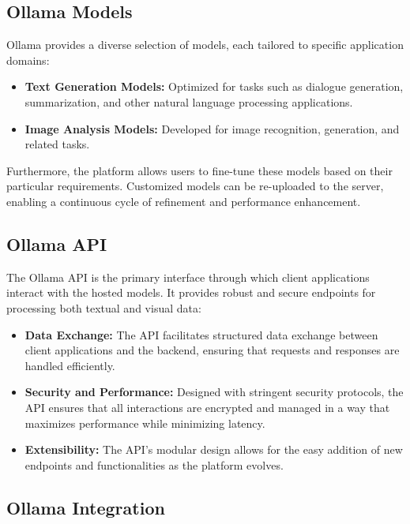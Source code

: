 \subsection{Ollama Models}

Ollama provides a diverse selection of models, each tailored to specific application domains:
\begin{itemize}
  \item \textbf{Text Generation Models:} Optimized for tasks such as dialogue generation, summarization, and other natural language processing applications.
  \item \textbf{Image Analysis Models:} Developed for image recognition, generation, and related tasks.
\end{itemize}
Furthermore, the platform allows users to fine-tune these models based on their particular requirements. Customized models can be re-uploaded to the server, enabling a continuous cycle of refinement and performance enhancement.

\subsection{Ollama API}

The Ollama API is the primary interface through which client applications interact with the hosted models. It provides robust and secure endpoints for processing both textual and visual data:
\begin{itemize}
  \item \textbf{Data Exchange:} The API facilitates structured data exchange between client applications and the backend, ensuring that requests and responses are handled efficiently.
  \item \textbf{Security and Performance:} Designed with stringent security protocols, the API ensures that all interactions are encrypted and managed in a way that maximizes performance while minimizing latency.
  \item \textbf{Extensibility:} The API’s modular design allows for the easy addition of new endpoints and functionalities as the platform evolves.
\end{itemize}

\subsection{Ollama Integration}

